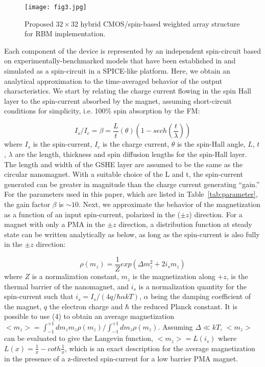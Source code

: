\begin{figure*}
\texttt{[image: fig3.jpg]}
\caption{Proposed $32 \times 32$ hybrid CMOS/spin-based weighted array structure for RBM implementation.}
\end{figure*}

Each component of the device is represented by an independent spin-circuit based on experimentally-benchmarked models that have been established in \cite{camsari2015modular} and simulated as a spin-circuit in a SPICE-like platform. Here, we obtain an analytical approximation to the time-averaged behavior of the output characteristics. We start by relating the charge current flowing in the spin Hall layer to the spin-current absorbed by the magnet, assuming short-circuit conditions for simplicity, i.e. 100\% spin absorption by the FM: 

\begin{equation}
  I_s/I_c = \beta = \frac{L}{t} (\theta) (1 - sech(\frac{t}{\lambda}))
\end{equation}
where $I_s$ is the spin-current, $I_c$ is the charge current, $\theta$ is the spin-Hall angle, $L$, $t$, $\lambda$ are the length, thickness and spin diffusion lengths for the spin-Hall layer. The length and width of the GSHE layer are assumed to be the same as the circular nanomagnet. With a suitable choice of the L and t, the spin-current generated can be greater in magnitude than the charge current generating ``gain.'' For the parameters used in this paper, which are listed in Table~\ref{tab:parameter}, the gain factor $\beta$ is $\sim 10$. Next, we approximate the behavior of the magnetization as a function of an input spin-current, polarized in the ($\pm z$) direction. For a magnet with only a PMA in the $\pm z$ direction, a distribution function at steady state can be written analytically as below, as long as the spin-current is also fully in the $\pm z$ direction:

\begin{equation}
  \rho (m_z) = \frac{1}{Z} exp(\Delta m_z^2 + 2 i_s m_z)
\end{equation}
where $Z$ is a normalization constant, $m_z$ is the magnetization along $+z$,  is the thermal barrier of the nanomagnet, and $i_s$ is a normalization quantity for the spin-current such that $i_s= I_s/(4q/ \hbar \alpha kT)$, $\alpha$ being the damping coefficient of the magnet, $q$ the electron charge and $\hbar$ the reduced Planck constant. It is possible to use (4) to obtain an average magnetization $<m_z> = \int_{-1}^{+1} d m_z m_z \rho (m_z) / \int_{-1}^{+1} d m_z \rho (m_z)$. Assuming $\Delta \ll kT$, $<m_z>$ can be evaluated to give the Langevin function, $<m_z> = L(i_s)$ where $L(x) = \frac{1}{x} - coth \frac{1}{x}$, which is an exact description for the average magnetization in the presence of a z-directed spin-current for a low barrier PMA magnet. 




